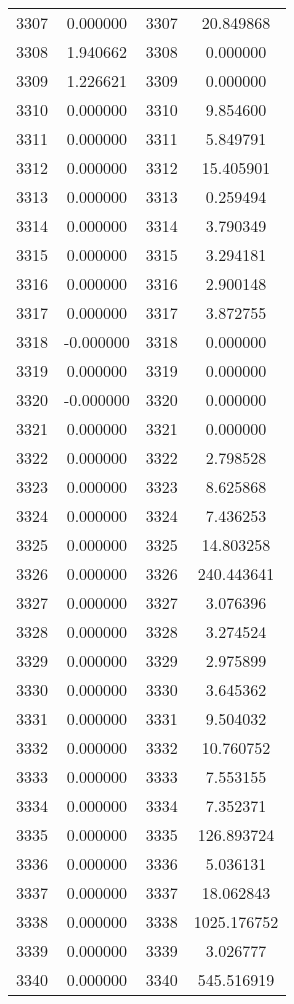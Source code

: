 \documentclass[12pt]{article}
\begin{document}
\begin{longtable}{@{}cccc@{}}
3307 & 0.000000 & 3307 & 20.849868 \\
3308 & 1.940662 & 3308 & 0.000000 \\
3309 & 1.226621 & 3309 & 0.000000 \\
3310 & 0.000000 & 3310 & 9.854600 \\
3311 & 0.000000 & 3311 & 5.849791 \\
3312 & 0.000000 & 3312 & 15.405901 \\
3313 & 0.000000 & 3313 & 0.259494 \\
3314 & 0.000000 & 3314 & 3.790349 \\
3315 & 0.000000 & 3315 & 3.294181 \\
3316 & 0.000000 & 3316 & 2.900148 \\
3317 & 0.000000 & 3317 & 3.872755 \\
3318 & -0.000000 & 3318 & 0.000000 \\
3319 & 0.000000 & 3319 & 0.000000 \\
3320 & -0.000000 & 3320 & 0.000000 \\
3321 & 0.000000 & 3321 & 0.000000 \\
3322 & 0.000000 & 3322 & 2.798528 \\
3323 & 0.000000 & 3323 & 8.625868 \\
3324 & 0.000000 & 3324 & 7.436253 \\
3325 & 0.000000 & 3325 & 14.803258 \\
3326 & 0.000000 & 3326 & 240.443641 \\
3327 & 0.000000 & 3327 & 3.076396 \\
3328 & 0.000000 & 3328 & 3.274524 \\
3329 & 0.000000 & 3329 & 2.975899 \\
3330 & 0.000000 & 3330 & 3.645362 \\
3331 & 0.000000 & 3331 & 9.504032 \\
3332 & 0.000000 & 3332 & 10.760752 \\
3333 & 0.000000 & 3333 & 7.553155 \\
3334 & 0.000000 & 3334 & 7.352371 \\
3335 & 0.000000 & 3335 & 126.893724 \\
3336 & 0.000000 & 3336 & 5.036131 \\
3337 & 0.000000 & 3337 & 18.062843 \\
3338 & 0.000000 & 3338 & 1025.176752 \\
3339 & 0.000000 & 3339 & 3.026777 \\
3340 & 0.000000 & 3340 & 545.516919 \\

\end{longtable}
\end{document}
